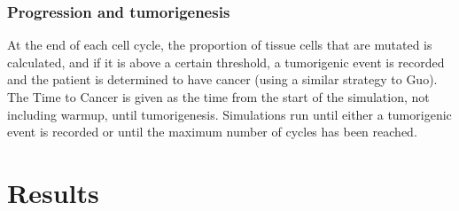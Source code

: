 \documentclass{article}
\begin{document}
\subsubsection{Progression and tumorigenesis}
At the end of each cell cycle, the proportion of tissue cells that are mutated is calculated, and if it is above a certain threshold, a tumorigenic event is recorded and the patient is determined to have cancer (using a similar strategy to Guo).
The Time to Cancer is given as the time from the start of the simulation, not including warmup, until tumorigenesis.
Simulations run until either a tumorigenic event is recorded or until the maximum number of cycles has been reached.






\section{Results}
\end{document}
